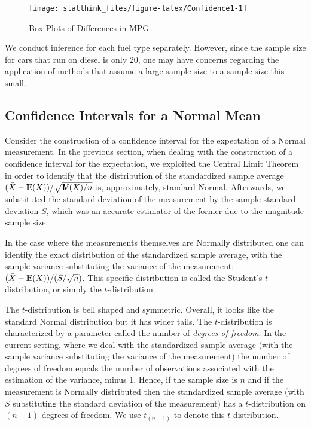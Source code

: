 \documentclass[]{krantz}
\newcommand{\Expec}{{\rm I\kern-.3em E}}
\newcommand{\Var}{{\rm I\kern-.3em V}}
\theoremstyle{definition}
\theoremstyle{definition}
\theoremstyle{definition}
\theoremstyle{remark}
\begin{document}
\begin{figure}

{\centering \texttt{[image: statthink\_files/figure-latex/Confidence1-1]} 

}

\caption{Box Plots of Differences in MPG}\label{fig:Confidence1}
\end{figure}

We conduct inference for each fuel type separately. However, since the
sample size for cars that run on diesel is only 20, one may have
concerns regarding the application of methods that assume a large sample
size to a sample size this small.

\hypertarget{confidence-intervals-for-a-normal-mean}{%
\subsection{Confidence Intervals for a Normal Mean}\label{confidence-intervals-for-a-normal-mean}}

Consider the construction of a confidence interval for the expectation
of a Normal measurement. In the previous section, when dealing with the
construction of a confidence interval for the expectation, we exploited
the Central Limit Theorem in order to identify that the distribution of
the standardized sample average \((\bar X - \Expec(X))/\sqrt{\Var(X)/n}\)
is, approximately, standard Normal. Afterwards, we substituted the
standard deviation of the measurement by the sample standard deviation
\(S\), which was an accurate estimator of the former due to the magnitude
sample size.

In the case where the measurements themselves are Normally distributed
one can identify the exact distribution of the standardized sample
average, with the sample variance substituting the variance of the
measurement: \((\bar X - \Expec(X))/(S/\sqrt{n})\). This specific
distribution is called the Student's \(t\)-distribution, or simply the
\(t\)-distribution.

The \(t\)-distribution is bell shaped and symmetric. Overall, it looks
like the standard Normal distribution but it has wider tails. The
\(t\)-distribution is characterized by a parameter called the number of
\emph{degrees of freedom}. In the current setting, where we deal with the
standardized sample average (with the sample variance substituting the
variance of the measurement) the number of degrees of freedom equals the
number of observations associated with the estimation of the variance,
minus 1. Hence, if the sample size is \(n\) and if the measurement is
Normally distributed then the standardized sample average (with \(S\)
substituting the standard deviation of the measurement) has a
\(t\)-distribution on \((n-1)\) degrees of freedom. We use \(t_{(n-1)}\) to
denote this \(t\)-distribution.
\end{document}
